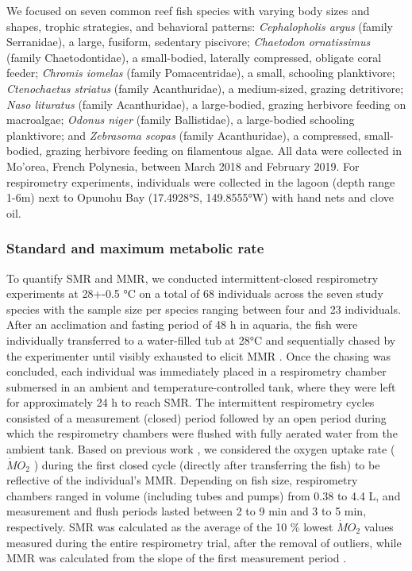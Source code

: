 \documentclass[
]{article}
\begin{document}
We focused on seven common reef fish species with varying body sizes and
shapes, trophic strategies, and behavioral patterns: \emph{Cephalopholis
argus} (family Serranidae), a large, fusiform, sedentary piscivore;
\emph{Chaetodon ornatissimus} (family Chaetodontidae), a small-bodied,
laterally compressed, obligate coral feeder; \emph{Chromis iomelas}
(family Pomacentridae), a small, schooling planktivore;
\emph{Ctenochaetus striatus} (family Acanthuridae), a medium-sized,
grazing detritivore; \emph{Naso lituratus} (family Acanthuridae), a
large-bodied, grazing herbivore feeding on macroalgae; \emph{Odonus
niger} (family Ballistidae), a large-bodied schooling planktivore; and
\emph{Zebrasoma scopas} (family Acanthuridae), a compressed,
small-bodied, grazing herbivore feeding on filamentous algae. All data
were collected in Mo'orea, French Polynesia, between March 2018 and
February 2019. For respirometry experiments, individuals were collected
in the lagoon (depth range 1-6m) next to Opunohu Bay (17.4928°S,
149.8555°W) with hand nets and clove oil.

\hypertarget{standard-and-maximum-metabolic-rate}{%
\subsubsection{Standard and maximum metabolic
rate}\label{standard-and-maximum-metabolic-rate}}

To quantify SMR and MMR, we conducted intermittent-closed respirometry
experiments \citep{Steffensen1989, Clark2013} at 28+-0.5 °C on a total
of 68 individuals across the seven study species with the sample size
per species ranging between four and 23 individuals. After an
acclimation and fasting period of 48 h in aquaria, the fish were
individually transferred to a water-filled tub at 28°C and sequentially
chased by the experimenter until visibly exhausted to elicit MMR
\citep{Norin2011, Clark2012}. Once the chasing was concluded, each
individual was immediately placed in a respirometry chamber submersed in
an ambient and temperature-controlled tank, where they were left for
approximately 24 h to reach SMR. The intermittent respirometry cycles
consisted of a measurement (closed) period followed by an open period
during which the respirometry chambers were flushed with fully aerated
water from the ambient tank. Based on previous work \citep{Norin2016},
we considered the oxygen uptake rate (\(\dot{M}O_{2}\) ) during the
first closed cycle (directly after transferring the fish) to be
reflective of the individual's MMR. Depending on fish size, respirometry
chambers ranged in volume (including tubes and pumps) from 0.38 to 4.4
L, and measurement and flush periods lasted between 2 to 9 min and 3 to
5 min, respectively. SMR was calculated as the average of the 10 \%
lowest \(\dot{M}O_{2}\) values measured during the entire respirometry
trial, after the removal of outliers, while MMR was calculated from the
slope of the first measurement period \citep{Chabot2016}.
\end{document}
